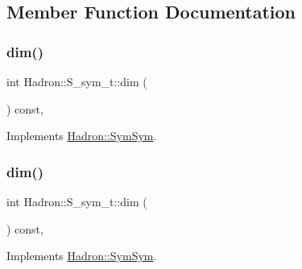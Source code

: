 \subsection{Member Function Documentation}
\mbox{\label{structHadron_1_1S__sym__t_ae8b1558dc91f46f5d78de03f1e587dc0}} 
\subsubsection{\texorpdfstring{dim()}{dim()}\hspace{0.1cm}{\footnotesize\ttfamily [1/5]}}
{\footnotesize\ttfamily int Hadron\+::\+S\+\_\+sym\+\_\+t\+::dim (\begin{DoxyParamCaption}{ }\end{DoxyParamCaption}) const\hspace{0.3cm}{\ttfamily [inline]}, {\ttfamily [virtual]}}



Implements \mbox{\hyperlink{structHadron_1_1SymSym_ae57780f41b9f6c03c6056eed3677bd48}{Hadron\+::\+Sym\+Sym}}.

\mbox{\label{structHadron_1_1S__sym__t_ae8b1558dc91f46f5d78de03f1e587dc0}} 
\subsubsection{\texorpdfstring{dim()}{dim()}\hspace{0.1cm}{\footnotesize\ttfamily [2/5]}}
{\footnotesize\ttfamily int Hadron\+::\+S\+\_\+sym\+\_\+t\+::dim (\begin{DoxyParamCaption}{ }\end{DoxyParamCaption}) const\hspace{0.3cm}{\ttfamily [inline]}, {\ttfamily [virtual]}}



Implements \mbox{\hyperlink{structHadron_1_1SymSym_ae57780f41b9f6c03c6056eed3677bd48}{Hadron\+::\+Sym\+Sym}}.

\mbox{\label{structHadron_1_1S__sym__t_ae8b1558dc91f46f5d78de03f1e587dc0}} 
